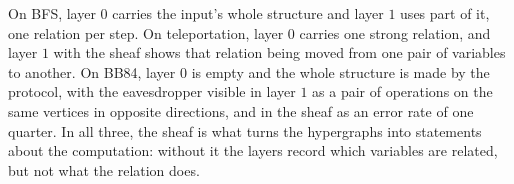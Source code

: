 \documentclass[11pt]{article}
\begin{document}
On BFS, layer $0$ carries the input's whole structure and layer $1$ uses part of it, one relation per step. On teleportation, layer $0$ carries one strong relation, and layer $1$ with the sheaf shows that relation being moved from one pair of variables to another. On BB84, layer $0$ is empty and the whole structure is made by the protocol, with the eavesdropper visible in layer $1$ as a pair of operations on the same vertices in opposite directions, and in the sheaf as an error rate of one quarter. In all three, the sheaf is what turns the hypergraphs into statements about the computation: without it the layers record which variables are related, but not what the relation does.
\end{document}
